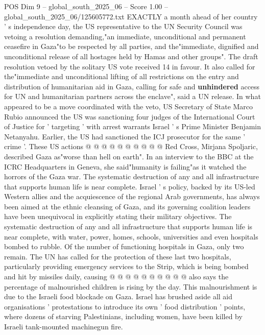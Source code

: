 \begin{textsample}{POS Dim 9 – global\_south\_2025\_06 – Score 1.00 – global\_south\_2025\_06/125605772.txt}  \label{ex:f9_pos_179}
EXACTLY a month ahead of her country ' s independence day, the US representative to the UN Security Council was vetoing a resolution demanding,"an immediate, unconditional and permanent ceasefire in Gaza"to be respected by all parties, and the"immediate, dignified and unconditional release of all hostages held by Hamas and other groups".
The draft resolution vetoed by the solitary US vote received 14 in favour.
It also called for the"immediate and unconditional lifting of all restrictions on the entry and distribution of humanitarian aid in Gaza, calling for safe and \textbf{unhindered} access for UN and humanitarian partners across the enclave", said a UN release.
In what appeared to be a move coordinated with the veto, US Secretary of State Marco Rubio announced the US was sanctioning four judges of the International Court of Justice for ' targeting ' with arrest warrants Israel ' s Prime Minister Benjamin Netanyahu.
Earlier, the US had sanctioned the ICJ prosecutor for the same ' crime '.
These US actions @ @ @ @ @ @ @ @ @ @ Red Cross, Mirjana Spoljaric, described Gaza as"worse than hell on earth".
In an interview to the BBC at the ICRC Headquarters in Geneva, she said"humanity is failing"as it watched the horrors of the Gaza war.
The systematic destruction of any and all infrastructure that supports human life is near complete.
Israel ' s policy, backed by its US-led Western allies and the acquiescence of the regional Arab governments, has always been aimed at the ethnic cleansing of Gaza, and its governing coalition leaders have been unequivocal in explicitly stating their military objectives.
The systematic destruction of any and all infrastructure that supports human life is near complete, with water, power, homes, schools, universities and even hospitals bombed to rubble.
Of the number of functioning hospitals in Gaza, only two remain.
The UN has called for the protection of these last two hospitals, particularly providing emergency services to the Strip, which is being bombed and hit by missiles daily, causing @ @ @ @ @ @ @ @ @ @ also says the percentage of malnourished children is rising by the day.
This malnourishment is due to the Israeli food blockade on Gaza.
Israel has brushed aside all aid organisations ' protestations to introduce its own ' food distribution ' points, where dozens of starving Palestinians, including women, have been killed by Israeli tank-mounted machinegun fire.

\end{textsample}
